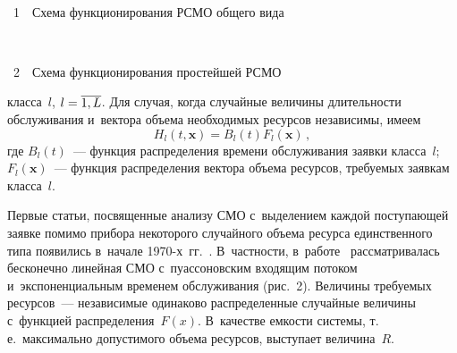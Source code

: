 \begin{multicols}{2}
{ \begin{center}  %
 \vspace*{9pt}
  \mbox{%
 \epsfxsize=78.288mm 
 }


\vspace*{6pt}


\noindent
{{\figurename~1}\ \ \small{Схема функционирования  РСМО общего вида}}
\end{center}
}


{ \begin{center}  %
 \vspace*{-2pt}
  \mbox{%
 \epsfxsize=61.777mm 
 }


\vspace*{9pt}

\noindent
{{\figurename~2}\ \ \small{Схема функционирования простейшей РСМО}}
\end{center}
}

\vspace*{9pt}





\noindent
 класса~$l$, 
$l\hm=\overline{1,L}$.
Для случая, когда случайные величины длительности обслуживания и~вектора объема 
необходимых ресурсов независимы, имеем 
$$
H_l(t,\mathbf{x})=B_l(t)F_l(\mathbf{x})\,,
$$
 где
$B_l(t)$~--- функция распределения времени обслуживания заявки класса~$l$;
$F_l(\mathbf{x})$~--- функция распределения вектора объема ресурсов, тре\-бу\-емых 
заявкам класса~$l$.

Первые статьи, посвященные анализу СМО с~выделением 
каждой поступающей заявке помимо прибора некоторого случайного объема ресурса 
единственного типа появились в~начале \mbox{1970-х~гг.}~\cite{Romm_21_1971,Kac}.
В~част\-ности, в~работе~\cite{Romm_21_1971} рассматривалась бесконечно линейная 
СМО с~пуассоновским входящим потоком 
и~экспоненциальным временем обслуживания (рис.~2). 
Величины требуемых 
ресурсов~--- независимые одинаково распределенные случайные величины с~функцией 
распределения~$F(x)$. В~качестве емкости системы, т.\,е.\ максимально допустимого 
объема ресурсов, выступает величина~$R$.


\end{multicols}
